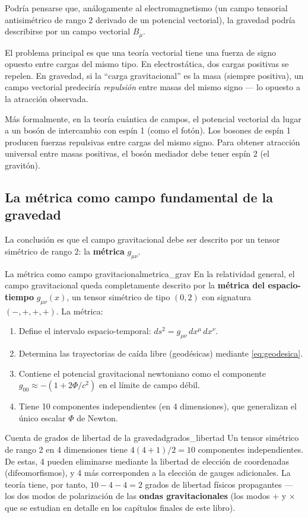 Podría pensarse que, análogamente al electromagnetismo (un campo tensorial antisimétrico de rango 2 derivado de un potencial vectorial), la gravedad podría describirse por un campo vectorial $B_\mu$.

El problema principal es que una teoría vectorial tiene una fuerza de signo opuesto entre cargas del mismo tipo. En electrostática, dos cargas positivas se repelen. En gravedad, si la ``carga gravitacional'' es la masa (siempre positiva), un campo vectorial predeciría \emph{repulsión} entre masas del mismo signo — lo opuesto a la atracción observada.

Más formalmente, en la teoría cuántica de campos, el potencial vectorial da lugar a un bosón de intercambio con espín 1 (como el fotón). Los bosones de espín 1 producen fuerzas repulsivas entre cargas del mismo signo. Para obtener atracción universal entre masas positivas, el bosón mediador debe tener espín 2 (el gravitón).

\subsection{La métrica como campo fundamental de la gravedad}

La conclusión es que el campo gravitacional debe ser descrito por un tensor simétrico de rango 2: la \textbf{métrica} $g_{\mu\nu}$.

\begin{definicion}{La métrica como campo gravitacional}{metrica_grav}
En la relatividad general, el campo gravitacional queda completamente descrito por la \textbf{métrica del espacio-tiempo} $g_{\mu\nu}(x)$, un tensor simétrico de tipo $(0,2)$ con signatura $(-,+,+,+)$. La métrica:
\begin{enumerate}[leftmargin=2em]
  \item Define el intervalo espacio-temporal: $ds^2 = g_{\mu\nu}\,dx^\mu\,dx^\nu$.
  \item Determina las trayectorias de caída libre (geodésicas) mediante \eqref{eq:geodesica}.
  \item Contiene el potencial gravitacional newtoniano como el componente $g_{00} \approx -(1 + 2\Phi/c^2)$ en el límite de campo débil.
  \item Tiene 10 componentes independientes (en 4 dimensiones), que generalizan el único escalar $\Phi$ de Newton.
\end{enumerate}
\end{definicion}

\begin{proposicion}{Cuenta de grados de libertad de la gravedad}{grados_libertad}
Un tensor simétrico de rango 2 en 4 dimensiones tiene $4(4+1)/2 = 10$ componentes independientes. De estas, 4 pueden eliminarse mediante la libertad de elección de coordenadas (difeomorfismos), y 4 más corresponden a la elección de gauges adicionales. La teoría tiene, por tanto, $10 - 4 - 4 = 2$ grados de libertad físicos propagantes — los dos modos de polarización de las \textbf{ondas gravitacionales} (los modos $+$ y $\times$ que se estudian en detalle en los capítulos finales de este libro).
\end{proposicion}


